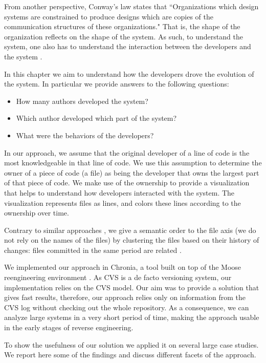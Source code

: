 From another perspective, Conway's law \cite{Conw68a} states that ``Organizations which design systems are constrained to produce designs which are copies of the communication structures of these organizations." That is, the shape of the organization reflects on the shape of the system. As such, to understand the system, one also has to understand the interaction between the developers and the system \cite{Deme02a}.

In this chapter we aim to understand how the developers drove the evolution of the system. In particular we provide answers to the following questions:
\begin{itemize}
\item How many authors developed the system?
\item Which author developed which part of the system?
\item What were the behaviors of the developers?
\end{itemize}

In our approach, we assume that the original developer of a line of code is the most knowledgeable in that line of code. We use this assumption to determine the owner of a piece of code (\eg a file) as being the developer that owns the largest part of that piece of code. We make use of the ownership to provide a visualization that helps to understand how developers interacted with the system. The visualization represents files as lines, and colors these lines according to the ownership over time.

Contrary to similar approaches \cite{Ryss04a}, we give a semantic order to the file axis (\ie we do not rely on the names of the files) by clustering the files based on their history of changes: files committed in the same period are related \cite{Gall98a}.

We implemented our approach in Chronia, a tool built on top of the Moose reengineering environment \cite{Duca05a}. As CVS is a de facto versioning system, our implementation relies on the CVS model. Our aim was to provide a solution that gives fast results, therefore, our approach relies only on information from the CVS log without checking out the whole repository. As a consequence, we can analyze large systems in a very short period of time, making the approach usable in the early stages of reverse engineering.

To show the usefulness of our solution we applied it on several large case studies. We report here some of the findings and discuss different facets of the approach.

